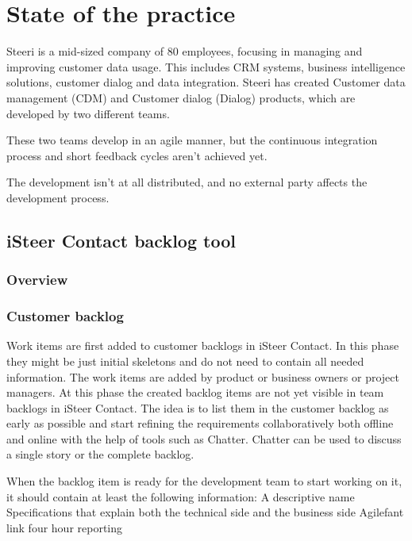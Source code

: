 \documentclass[english]{tktltiki2}
\theoremstyle{definition}
\theoremstyle{remark}
\begin{document}
\section{State of the practice}	
Steeri is a mid-sized company of 80 employees, focusing in managing and improving customer data usage. This includes CRM systems, business intelligence solutions, customer dialog and data integration. Steeri has created Customer data management (CDM) and Customer dialog (Dialog) products, which are developed by two different teams. 

These two teams develop in an agile manner, but the continuous integration process \cite{fowler2006continuous} and short feedback cycles aren't achieved yet. 

The development isn't at all distributed, and no external party affects the development process. 

\subsection{iSteer Contact backlog tool}

\subsubsection{Overview}

\subsubsection{Customer backlog}
Work items are first added to customer backlogs in iSteer Contact. In this phase they might be just initial skeletons and do not need to contain all needed information. The work items are added by product or business owners or project managers. At this phase the created backlog items are not yet visible in team backlogs in iSteer Contact. The idea is to list them in the customer backlog as early as possible and start refining the requirements collaboratively both offline and online with the help of tools such as Chatter. Chatter can be used to discuss a single story or the complete backlog.

When the backlog item is ready for the development team to start working on it, it should contain at least the following information:
A descriptive name
Specifications that explain both the technical side and the business side
Agilefant link four hour reporting
\end{document}
